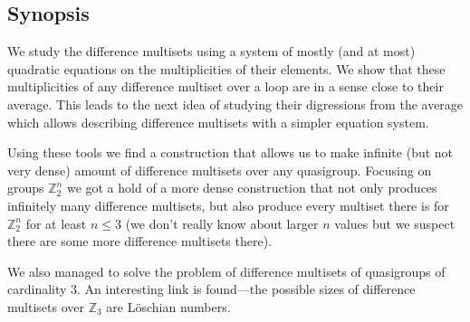 \subsection{Synopsis}

    We study the difference multisets using a system of mostly (and at most) quadratic equations on the multiplicities of their elements. We show that these multiplicities of any difference multiset over a loop are in a sense close to their average. This leads to the next idea of studying their digressions from the average which allows describing difference multisets with a simpler equation system.

    Using these tools we find a construction that allows us to make infinite (but not very dense) amount of difference multisets over any quasigroup. Focusing on groups $\mathbb Z_2^n$ we got a hold of a more dense construction that not only produces infinitely many difference multisets, but also produce every multiset there is for $\mathbb Z_2^n$ for at least $n \leq 3$ (we don't really know about larger $n$ values but we suspect there are some more difference multisets there).

    We also managed to solve the problem of difference multisets of quasigroups of cardinality 3. An interesting link is found---the possible sizes of difference multisets over $\mathbb Z_3$ are Löschian numbers.
    
